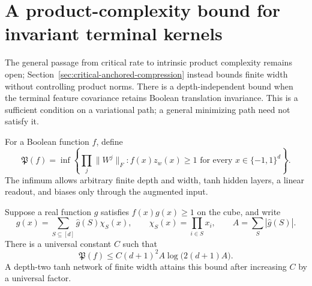 \section{A product-complexity bound for invariant terminal kernels}
\label{sec:critical-invariant-kernel-product}

The general passage from critical rate to intrinsic product complexity
remains open; Section~\ref{sec:critical-anchored-compression} instead
bounds finite width without controlling product norms. There is a depth-independent bound when the terminal
feature covariance retains Boolean translation invariance. This is a
sufficient condition on a variational path; a general minimizing path
need not satisfy it.

For a Boolean function $f$, define
\[
 \mathfrak P(f)=\inf\left\{\prod_j\|W^j\|_F:
 f(x)z_w(x)\ge1\text{ for every }x\in\{-1,1\}^d\right\}.
\]
The infimum allows arbitrary finite depth and width, tanh hidden layers,
a linear readout, and biases only through the augmented input.

\begin{lemma}
\label{lem:critical-fourier-product}
Suppose a real function $g$ satisfies $f(x)g(x)\ge1$ on the cube, and
write
\[
 g(x)=\sum_{S\subseteq[d]}\widehat g(S)\chi_S(x),
 \qquad \chi_S(x)=\prod_{i\in S}x_i,
 \qquad A=\sum_S|\widehat g(S)|.
\]
There is a universal constant $C$ such that
\[
 \mathfrak P(f)\le C(d+1)^2A\log\bigl(2(d+1)A\bigr).
\]
A depth-two tanh network of finite width attains this bound after
increasing $C$ by a universal factor.
\end{lemma}

